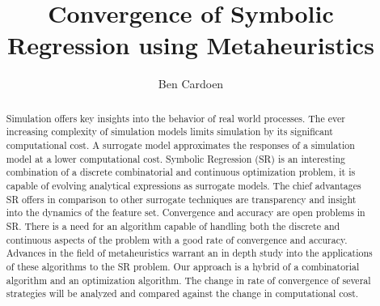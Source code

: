 \documentclass[]{article}
\title{Convergence of Symbolic Regression using Metaheuristics}
\date{\vspace{-5ex}}
\author{Ben Cardoen}
\begin{document}
\maketitle

\begin{abstract}
Simulation offers key insights into the behavior of real world processes. The ever increasing complexity of simulation models limits simulation by its significant computational cost.
A surrogate model approximates the responses of a simulation model at a lower computational cost. 
Symbolic Regression (SR) is an interesting combination of a discrete combinatorial and continuous optimization problem, it is capable of evolving analytical expressions as surrogate models. 
The chief advantages SR offers in comparison to other surrogate techniques are transparency and insight into the dynamics of the feature set. %
Convergence and accuracy are open problems in SR. 
There is a need for an algorithm capable of handling both the discrete and continuous aspects of the problem with a good rate of convergence and accuracy.
Advances in the field of metaheuristics warrant an in depth study into the applications of these algorithms to the SR problem. 
Our approach is a hybrid of a combinatorial algorithm and an optimization algorithm.
The change in rate of convergence of several strategies will be analyzed and compared against the change in computational cost.
\end{abstract}
\end{document}
